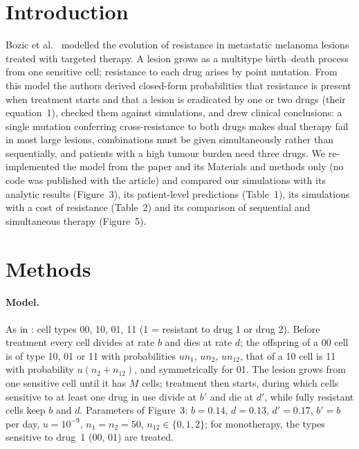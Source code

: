 
\section*{Introduction}
Bozic et al.\ \cite{bozic2013} modelled the evolution of resistance in metastatic melanoma
lesions treated with targeted therapy. A lesion grows as a multitype birth--death process
from one sensitive cell; resistance to each drug arises by point mutation. From this model
the authors derived closed-form probabilities that resistance is present when treatment
starts and that a lesion is eradicated by one or two drugs (their equation~1), checked
them against simulations, and drew clinical conclusions: a single mutation conferring
cross-resistance to both drugs makes dual therapy fail in most large lesions, combinations
must be given simultaneously rather than sequentially, and patients with a high tumour
burden need three drugs. We re-implemented the model from the paper and its Materials and
methods only (no code was published with the article) and compared our simulations with
its analytic results (Figure~3), its patient-level predictions (Table~1), its simulations
with a cost of resistance (Table~2) and its comparison of sequential and simultaneous
therapy (Figure~5).

\section*{Methods}
\paragraph{Model.} As in \cite{bozic2013}: cell types 00, 10, 01, 11 (1 = resistant to drug
1 or drug 2). Before treatment every cell divides at rate $b$ and dies at rate $d$; the
offspring of a 00 cell is of type 10, 01 or 11 with probabilities $un_1$, $un_2$, $un_{12}$,
that of a 10 cell is 11 with probability $u(n_2+n_{12})$, and symmetrically for 01. The lesion
grows from one sensitive cell until it has $M$ cells; treatment then starts, during which
cells sensitive to at least one drug in use divide at $b'$ and die at $d'$, while fully
resistant cells keep $b$ and $d$. Parameters of Figure~3: $b=0.14$, $d=0.13$, $d'=0.17$,
$b'=b$ per day, $u=10^{-9}$, $n_1=n_2=50$, $n_{12}\in\{0,1,2\}$; for monotherapy, the types
sensitive to drug~1 (00, 01) are treated.

